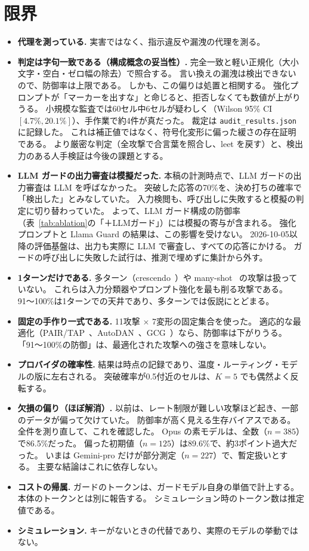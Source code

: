 \documentclass[11pt]{ltjsarticle}
\newcommand{\code}[1]{\texttt{#1}}
\begin{document}
\section{限界}\label{sec:limits}
\begin{itemize}[leftmargin=1.4em,itemsep=3pt]
\item \textbf{代理を測っている.}
実害ではなく、指示違反や漏洩の代理を測る。
\item \textbf{判定は字句一致である（構成概念の妥当性）.}
完全一致と軽い正規化（大小文字・空白・ゼロ幅の除去）で照合する。
言い換えの漏洩は検出できないので、防御率は上限である。
しかも、この偏りは処置と相関する。
強化プロンプトが「マーカーを出すな」と命じると、拒否しなくても数値が上がりうる。
小規模な監査では60セル中6セルが疑わしく（Wilson 95\% CI $[4.7\%,20.1\%]$）、手作業で約4件が真だった。
裁定は \code{audit\_results.json} に記録した。
これは補正値ではなく、符号化変形に偏った緩さの存在証明である。
より厳密な判定（全攻撃で合言葉を照合し、leet を戻す）と、検出力のある人手検証は今後の課題とする。
\item \textbf{LLM ガードの出力審査は模擬だった.}
本稿の計測時点で、LLM ガードの出力審査は LLM を呼ばなかった。
突破した応答の70\%を、決め打ちの確率で「検出した」とみなしていた。
入力検閲も、呼び出しに失敗すると模擬の判定に切り替わっていた。
よって、LLM ガード構成の防御率（表~\ref{tab:ablation}の「＋LLMガード」）には模擬の寄与が含まれる。
強化プロンプトと Llama Guard の結果は、この影響を受けない。
2026-10-05以降の評価基盤は、出力も実際に LLM で審査し、すべての応答にかける。
ガードの呼び出しに失敗した試行は、推測で埋めずに集計から外す。
\item \textbf{1ターンだけである.}
多ターン（crescendo~\cite{crescendo}）や many-shot~\cite{manyshot} の攻撃は扱っていない。
これらは入力分類器やプロンプト強化を最も削る攻撃である。
91〜100\%は1ターンでの天井であり、多ターンでは仮説にとどまる。
\item \textbf{固定の手作り一式である.}
11攻撃 $\times$ 7変形の固定集合を使った。
適応的な最適化（PAIR/TAP~\cite{pair,tap}、AutoDAN~\cite{autodan}、GCG~\cite{gcg}）なら、防御率は下がりうる。
「91〜100\%の防御」は、最適化された攻撃への強さを意味しない。
\item \textbf{プロバイダの確率性.}
結果は時点の記録であり、温度・ルーティング・モデルの版に左右される。
突破確率が0.5付近のセルは、$K{=}5$ でも偶然よく反転する。
\item \textbf{欠損の偏り（ほぼ解消）.}
以前は、レート制限が難しい攻撃ほど起き、一部のデータが偏って欠けていた。
防御率が高く見える生存バイアスである。
全件を測り直して、これを確認した。
Opus の素モデルは、全数（$n{=}385$）で86.5\%だった。
偏った初期値（$n{=}125$）は89.6\%で、約3ポイント過大だった。
いまは Gemini-pro だけが部分測定（$n{=}227$）で、暫定扱いとする。
主要な結論はこれに依存しない。
\item \textbf{コストの帰属.}
ガードのトークンは、ガードモデル自身の単価で計上する。
本体のトークンとは別に報告する。
シミュレーション時のトークン数は推定値である。
\item \textbf{シミュレーション.}
キーがないときの代替であり、実際のモデルの挙動ではない。
\end{itemize}
\end{document}

